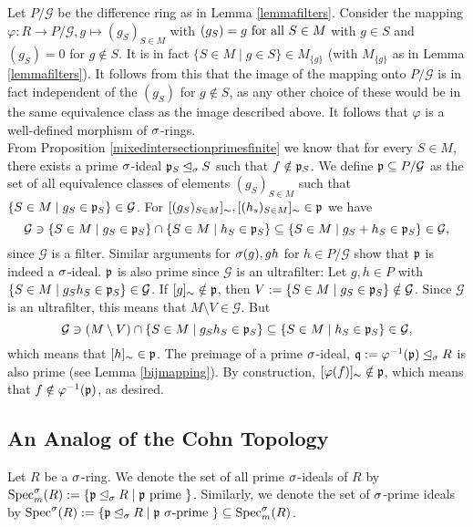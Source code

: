 \begin{theorem}
\begin{bew}
Let $P/\mathcal{G}$ be the difference ring as in Lemma \ref{lemmafilters}. Consider the mapping $\varphi: R \rightarrow P/\mathcal{G}, g \mapsto (g_S)_{S \in M}$ with $(g_S) = g \text{ for all } S \in M$ with $g \in S$ and $(g_S) = 0$ for $g \notin S$. 
It is in fact $\{ S \in M \mid g \in S \} \in M_{\{g\}}$ (with $M_{\{g\}}$ as in Lemma \ref{lemmafilters}). It follows from this that the image of the mapping onto $P/\mathcal{G}$ is in fact independent of the $(g_S)$ for $g \notin S$, as any other choice of these would be in the same equivalence class as the image described above.
It follows that $\varphi$ is a well-defined morphism of $\sigma$-rings. \\
\indent From Proposition \ref{mixedintersectionprimesfinite} we know that for every $S \in M$, there exists a prime $\sigma$-ideal $\mathfrak{p}_S \unlhd_{\sigma} S$ such that $f \notin \mathfrak{p}_S$. 
We define $\mathfrak{p} \subseteq P/\mathcal{G}$ as the set of all equivalence classes of elements $(g_S)_{S \in M}$ such that $\{ S \in M \mid g_S \in \mathfrak{p}_S \} \in \mathcal{G}$. 
For $[(g_S)_{S \in M}]_{\sim}, [(h_s)_{S \in M}]_{\sim} \in \mathfrak{p}$ we have $$ \mathcal{G} \ni \{ S \in M \mid  g_S \in \mathfrak{p}_S \} \cap  \{ S \in M \mid  h_S \in \mathfrak{p}_S \} \subseteq \{ S \in M \mid  g_S + h_S \in \mathfrak{p}_S \} \in \mathcal{G},$$
since $\mathcal{G}$ is a filter. Similar arguments for $\sigma(g), gh$ for $h \in P/\mathcal{G}$ show that $\mathfrak{p}$ is indeed a $\sigma$-ideal. $\mathfrak{p}$ is also prime since $\mathcal{G}$ is an ultrafilter:
Let $g,h \in P$ with $\{ S \in M \mid g_Sh_S \in \mathfrak{p}_S \} \in \mathcal{G}$. If $[g]_\sim \notin \mathfrak{p}$, then $V:= \{ S \in M \mid g_S \in \mathfrak{p}_S \} \notin \mathcal{G}$. Since $\mathcal{G}$ is an ultrafilter, 
this means that $M \setminus V \in \mathcal{G}$. But $$\mathcal{G} \ni (M \setminus V) \cap \{ S \in M \mid g_S h_S \in \mathfrak{p}_S \} \subseteq \{ S \in M \mid h_S \in \mathfrak{p}_S \} \in \mathcal{G},$$
which means that $[h]_\sim \in \mathfrak{p}$. The preimage of a prime $\sigma$-ideal, $\mathfrak{q} := \varphi^{-1}(\mathfrak{p}) \unlhd_{\sigma} R$ is also prime (see Lemma \ref{bijmapping}). By construction, $[\varphi(f)]_\sim \notin \mathfrak{p}$, which means that $f \notin \varphi^{-1}(\mathfrak{p})$, as desired. 

\end{bew}
\end{theorem}

\subsection{An Analog of the Cohn Topology}

\begin{defn}
Let $R$ be a $\sigma$-ring. We denote the set of all prime $\sigma$-ideals of $R$ by $\operatorname{Spec}^\sigma_m(R):= \{ \mathfrak{p} \unlhd_{\sigma} R \mid \mathfrak{p} \text{ prime }\}$. Similarly, we denote the set of $\sigma$-prime ideals by $\operatorname{Spec}^\sigma(R):= \{ \mathfrak{p} \unlhd_{\sigma} R \mid \mathfrak{p} ~ \sigma\text{-prime }\} \subseteq \operatorname{Spec}^\sigma_m(R)$.
\index{$\sSpec$} \index{$\Spec^\s$}
\end{defn}


